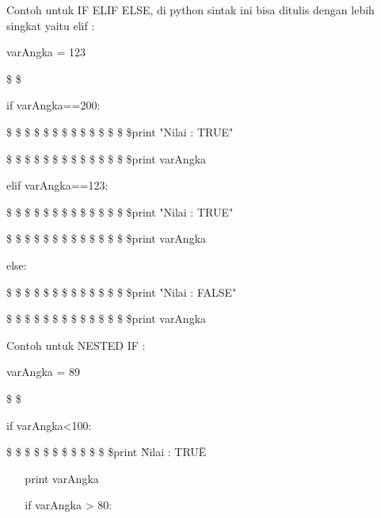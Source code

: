 Contoh untuk IF ELIF ELSE, di python sintak ini bisa ditulis dengan lebih singkat yaitu elif :  \par
\vspace{12pt}
\noindent 
varAngka = 123 \par
\noindent 
 \$  \$ \par
\noindent 
if varAngka==200: \par
\vspace{12pt}
\noindent 
 \$  \$  \$  \$  \$  \$  \$  \$  \$  \$  \$  \$  \$  \$print "Nilai : TRUE" \par
\vspace{12pt}
\noindent 
 \$  \$  \$  \$  \$  \$  \$  \$  \$  \$  \$  \$  \$  \$print varAngka \par
\vspace{12pt}
\noindent 
elif varAngka==123: \par
\vspace{12pt}
\noindent 
 \$  \$  \$  \$  \$  \$  \$  \$  \$  \$  \$  \$  \$  \$print "Nilai : TRUE" \par
\vspace{12pt}
\noindent 
 \$  \$  \$  \$  \$  \$  \$  \$  \$  \$  \$  \$  \$  \$print varAngka \par
\vspace{12pt}
\noindent 
else: \par
\vspace{12pt}
\noindent 
 \$  \$  \$  \$  \$  \$  \$  \$  \$  \$  \$  \$  \$  \$print "Nilai : FALSE" \par
\vspace{12pt}
\noindent 
 \$  \$  \$  \$  \$  \$  \$  \$  \$  \$  \$  \$  \$  \$print varAngka \par
\vspace{12pt}
\noindent 
Contoh untuk NESTED IF :  \par
\vspace{12pt}
\noindent 
varAngka = 89 \par
\noindent 
 \$  \$ \par
\noindent 
if varAngka<100: \par
\vspace{12pt}
\noindent 
 \$  \$  \$  \$  \$  \$  \$  \$  \$  \$  \$  \$print \"Nilai : TRUE\" \par
\vspace{12pt}
\noindent 
 $  $  $  $  $  $  $  $  $  $  $  $print varAngka \par
\vspace{12pt}
\noindent 
 $  $  $  $  $  $  $  $  $  $  $  $if varAngka > 80: \par
